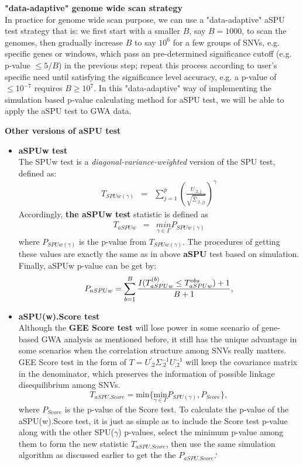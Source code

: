 \documentclass[compress]{beamer}
\begin{document}
\begin{frame}[allowframebreaks]
\framebreak
\textbf{"data-adaptive" genome wide scan strategy}\\
In practice for genome wide scan purpose, we can use a "data-adaptive" aSPU test strategy that is: we first start with a smaller $B$, say $B = 1000$, to scan the genomes, then gradually increase $B$ to say $10^6$ for a few groups of SNVs, e.g. specific genes or windows, which pass an pre-determined significance cutoff (e.g. p-value $ \leq 5/B$) in the previous step; repeat this process according to user's specific need until satisfying the significance level accuracy, e.g. a p-value of $\leq 10 ^ {-7}$ requires $B \geq 10^7$. In this "data-adaptive" way of implementing the simulation based p-value calculating method for aSPU test, we will be able to apply the aSPU test to GWA data. 

\framebreak
\textbf{Other versions of aSPU test}
\begin{itemize}
\item \textbf{aSPUw test}\\
The SPUw test is a \textit{diagonal-variance-weighted} version of the SPU test, defined as:
\begin{eqnarray*}
T_{SPUw(\gamma)} & = & \sum_{j=1}^{p}\left(\frac{U_{.2,j}}{\sqrt{\hat{\Sigma}_{.2,jj}}}\right)^{\gamma}
\end{eqnarray*}
Accordingly, \textbf{the aSPUw test} statistic is defined as
\begin{eqnarray*}
T_{aSPUw} & = & \underset{\gamma\in\Gamma}{min}P_{SPUw(\gamma)}
\end{eqnarray*}
where $P_{SPUw(\gamma)}$ is the p-value from $T_{SPUw(\gamma)}$. The procedures of getting these values are exactly the same as in above \textbf{aSPU} test based on simulation. Finally, aSPUw p-value can be get by:
$$
P_{aSPUw} = \sum_{b=1}^B { I(T ^ {(b)} _{aSPUw} \leq T ^ {obs} _{aSPUw} ) + 1  \over B + 1 },
$$

\framebreak
\item \textbf{aSPU(w).Score test }\\
Although the \textbf{GEE Score test} will lose power in some scenario of gene-based GWA analysis as mentioned before, it still has the unique advantage in some scenarios when the correlation structure among SNVs really matters. GEE Score test in the form of $T=U_{.2}^{'}\Sigma_{.2}^{-1}U_{.2}^{-1}$ will keep the covariance matrix in the denominator, which preserves the information of possible linkage disequilibrium among SNVs. 
$$
T_{aSPU.Score} = \textrm{min} \Big\{ \underset{\gamma\in\Gamma}{ \textrm{min} } P_{ SPU(\gamma) }, P_{Score} \Big\},
$$ 
where $P_{Score}$ is the p-value of the Score test. To calculate the p-value of the aSPU(w).Score test, it is just as simple as to include the Score test p-value along with the other SPU($\gamma$) p-values, select the minimum p-value among them to form the new statistic $T_{aSPU.Score}$, then use the same simulation algorithm as discussed earlier to get the the $P_{aSPU.Score}$.`
\end{itemize}
\end{frame}
\end{document}
